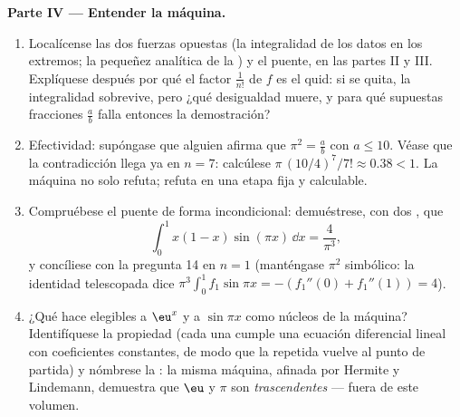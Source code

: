 \begin{problem}
\medskip
\noindent\textbf{Parte IV --- Entender la máquina.}
\begin{enumerate}[resume]
  \item Localícense las dos fuerzas opuestas (la integralidad de
        los datos en los extremos; la pequeñez analítica de la
        ) y el puente, en las partes II y III. Explíquese
        después por qué el factor $\frac{1}{n!}$ de $f$ es el
        quid: si se quita, la integralidad sobrevive, pero ¿qué
        desigualdad muere, y para qué supuestas fracciones
        $\frac ab$ falla entonces la demostración?
  \item Efectividad: supóngase que alguien afirma que
        $\pi^2 = \frac ab$ con $a \leq 10$. Véase que la
        contradicción llega ya en $n = 7$: calcúlese
        $\pi\,(10/4)^7/7! \approx 0.38 < 1$. La máquina no solo
        refuta; refuta en una etapa fija y calculable.
  \item Compruébese el puente de forma incondicional: demuéstrese,
        con dos , que
        \[
        \int_0^1 x(1 - x)\sin(\pi x)\,\dd x = \frac{4}{\pi^3},
        \]
        y concíliese con la pregunta 14 en $n = 1$ (manténgase
        $\pi^2$ simbólico: la identidad telescopada dice
        $\pi^3 \int_0^1 f_1 \sin \pi x = -(f_1''(0) + f_1''(1)) = 4$).
  \item ¿Qué hace elegibles a $\eu^x$ y a $\sin \pi x$ como núcleos
        de la máquina? Identifíquese la propiedad (cada una cumple
        una ecuación diferencial lineal con coeficientes constantes,
        de modo que la  repetida vuelve al
        punto de partida) y nómbrese la : la misma máquina,
        afinada por Hermite y Lindemann, demuestra que $\eu$ y $\pi$
        son \emph{trascendentes} --- fuera de este volumen.
\end{enumerate}


\end{problem}
